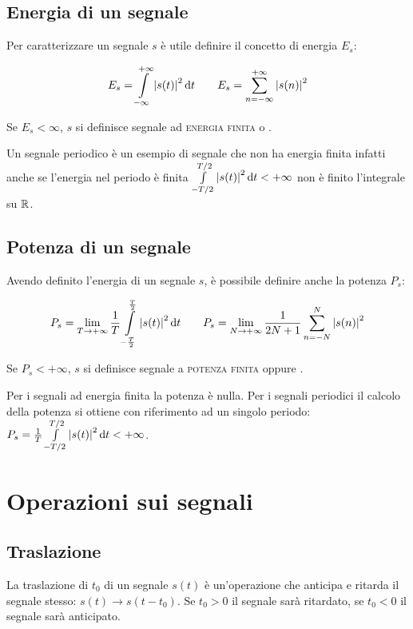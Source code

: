 \subsection{Energia di un segnale}
Per caratterizzare un segnale $s$ è utile definire il concetto di energia $E_s$:

\begin{equation}\label{eq:segnale_energia}
E_s=\int\limits_{-\infty}^{+\infty}{\left|{s(t)}\right|^2}{\,\mathop{}\!\mathrm{d}{t}} \qquad E_s=\sum_{n=-\infty}^{+\infty}\left|{s(n)}\right|^2
\end{equation}

Se $E_s < \infty$, $s$  si definisce segnale ad \textsc{energia finita} o .

Un segnale periodico è un esempio di segnale che non ha energia finita infatti anche se l'energia nel periodo è finita $\int\limits_{-T/2}^{T/2}{\left|{s(t)}\right|^2}{\,\mathop{}\!\mathrm{d}{t}}<+\infty$ non è finito l'integrale su $\mathbb{R}$.

\subsection{Potenza di un segnale}
Avendo definito l'energia di un segnale $s$, è possibile definire anche la potenza $P_s$:

\begin{equation}\label{eq:segnale_potenza}
P_s=\lim\limits_{T\to+\infty}{\frac{1}{T}\int\limits_{-\frac{T}{2}}^{\frac{T}{2}}{\left|{s(t)}\right|^2}{\,\mathop{}\!\mathrm{d}{t}}}\qquad
P_s=\lim\limits_{N\to+\infty}{\frac{1}{2N+1}\sum_{n=-N}^{N}{\left|{s(n)}\right|^2}}
\end{equation}

Se $P_s<+\infty$, $s$ si definisce segnale a \textsc{potenza finita} oppure .

Per i segnali ad energia finita la potenza è nulla. Per i segnali periodici il calcolo della potenza si ottiene con riferimento ad un singolo periodo: $P_s=\frac{1}{T}\int\limits_{-T/2}^{T/2}{\left|{s(t)}\right|^2}{\,\mathop{}\!\mathrm{d}{t}}<+\infty$.

\section{Operazioni sui segnali}
\subsection{Traslazione}
La traslazione di $t_0$ di un segnale $s(t)$ è un'operazione che anticipa e ritarda il segnale stesso: 
$s(t) \to s(t-t_0)$. Se $t_0>0$ il segnale sarà ritardato, se $t_0<0$ il segnale sarà anticipato.
